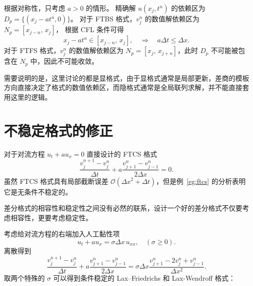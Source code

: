 \begin{solution*}
    根据对称性，只考虑 $a>0$ 的情形。
    精确解 $u(x_j,t^n)$ 的依赖区为 $D_p = \{(x_j - a t^n,0)\}$。
    对于 FTBS 格式，$v_j^n$ 的数值解依赖区为 $N_p = [x_{j-n},\, x_{j}]$，
    根据 CFL 条件可得
    \[
        x_j - a t^n \in [x_{j-n},\, x_{j}],
        \quad \Rightarrow \quad a \Delta t \le \Delta x.
    \]
    对于 FTFS 格式，$v_j^n$ 的数值解依赖区为 $N_p = [x_{j},\, x_{j+n}]$，此时 $D_p$ 不可能被包含在 $N_p$ 中，因此不可能收敛。
\end{solution*}

\begin{remark}
    需要说明的是，这里讨论的都是显格式，由于显格式通常是局部更新，差商的模板方向直接决定了格式的数值依赖区，而隐格式通常是全局联列求解，并不能直接套用这里的逻辑。
\end{remark}


\section{不稳定格式的修正}

对于对流方程 $u_t + a u_x = 0$ 直接设计的 FTCS 格式
\[
    \frac{v_j^{n+1}-v_j^n}{\Delta t} + a \frac{v_{j+1}^n-v_{j-1}^n}{2\Delta x} = 0.
\]
虽然 FTCS 格式具有局部截断误差 $\mathcal{O}(\Delta x^2 + \Delta t)$，但是例~\ref{eg:ftcs} 的分析表明它是无条件不稳定的。

\begin{remark}
    差分格式的相容性和稳定性之间没有必然的联系，设计一个好的差分格式不仅要考虑相容性，更要考虑稳定性。
\end{remark}

考虑给对流方程的右端加入人工黏性项
\[
    u_t + a u_x =  \sigma \Delta x\, u_{xx},\quad (\sigma \ge 0).
\]
离散得到
\[
    \frac{v_j^{n+1}-v_j^n}{\Delta t} + a \frac{v_{j+1}^n-v_{j-1}^n}{2\Delta x} = \sigma \Delta x \frac{v_{j+1}^n-2 v_j^n+v_{j-1}^n}{\Delta x^2}.
\]
取两个特殊的 $\sigma$ 可以得到条件稳定的 Lax–Friedrichs 和 Lax-Wendroff 格式：

